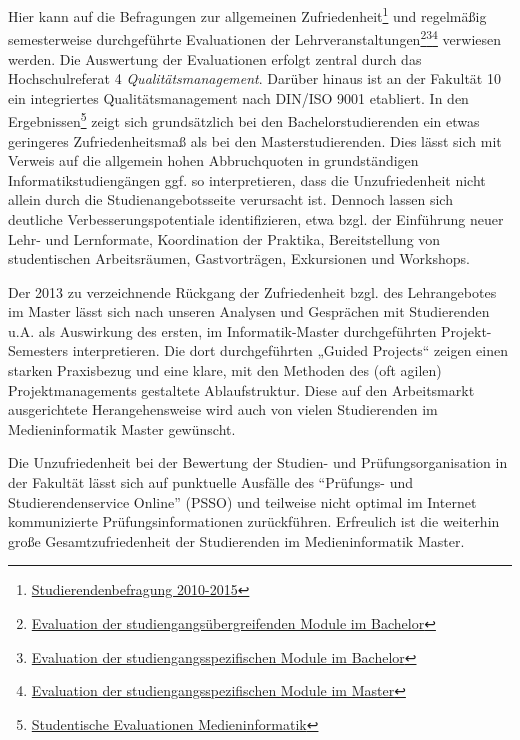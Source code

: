 Hier kann auf die Befragungen zur allgemeinen Zufriedenheit\footnote{\href{https://th-koeln.github.io/mi-2017/anhaenge/eva-studierendenbefragung-2010-2015.pdf}{Studierendenbefragung
  2010-2015}} und regelmäßig semesterweise durchgeführte Evaluationen
der Lehrveranstaltungen\footnote{\href{https://th-koeln.github.io/mi-2017/anhaenge/eva-lv-bewertung-mi-module-ba-kern.pdf}{Evaluation
  der studiengangsübergreifenden Module im Bachelor}}\footnote{\href{https://th-koeln.github.io/mi-2017/anhaenge/eva-lv-bewertung-mi-module-ba.pdf}{Evaluation
  der studiengangsspezifischen Module im Bachelor}}\footnote{\href{https://th-koeln.github.io/mi-2017/anhaenge/eva-lv-bewertung-mi-module-ma.pdf}{Evaluation
  der studiengangsspezifischen Module im Master}} verwiesen werden. Die
Auswertung der Evaluationen erfolgt zentral durch das Hochschulreferat 4
\emph{Qualitätsmanagement}. Darüber hinaus ist an der Fakultät 10 ein
integriertes Qualitätsmanagement nach DIN/ISO 9001 etabliert. In den
Ergebnissen\footnote{\href{https://th-koeln.github.io/mi-2017/anhaenge/eva-evaluationen-f10.pdf}{Studentische
  Evaluationen Medieninformatik}} zeigt sich grundsätzlich bei den
Bachelorstudierenden ein etwas geringeres Zufriedenheitsmaß als bei den
Masterstudierenden. Dies lässt sich mit Verweis auf die allgemein hohen
Abbruchquoten in grundständigen Informatikstudiengängen ggf. so
interpretieren, dass die Unzufriedenheit nicht allein durch die
Studienangebotsseite verursacht ist. Dennoch lassen sich deutliche
Verbesserungspotentiale identifizieren, etwa bzgl. der Einführung neuer
Lehr- und Lernformate, Koordination der Praktika, Bereitstellung von
studentischen Arbeitsräumen, Gastvorträgen, Exkursionen und Workshops.

Der 2013 zu verzeichnende Rückgang der Zufriedenheit bzgl. des
Lehrangebotes im Master lässt sich nach unseren Analysen und Gesprächen
mit Studierenden u.A. als Auswirkung des ersten, im Informatik-Master
durchgeführten Projekt-Semesters interpretieren. Die dort durchgeführten
„Guided Projects`` zeigen einen starken Praxisbezug und eine klare, mit
den Methoden des (oft agilen) Projektmanagements gestaltete
Ablaufstruktur. Diese auf den Arbeitsmarkt ausgerichtete
Herangehensweise wird auch von vielen Studierenden im Medieninformatik
Master gewünscht.

Die Unzufriedenheit bei der Bewertung der Studien- und
Prüfungsorganisation in der Fakultät lässt sich auf punktuelle Ausfälle
des ``Prüfungs- und Studierendenservice Online'' (PSSO) und teilweise
nicht optimal im Internet kommunizierte Prüfungsinformationen
zurückführen. Erfreulich ist die weiterhin große Gesamtzufriedenheit der
Studierenden im Medieninformatik Master.

